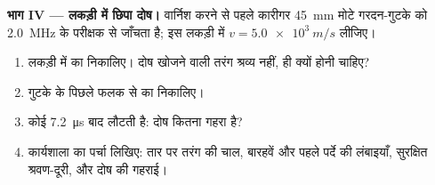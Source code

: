 \begin{problem}
\medskip
\noindent\textbf{भाग IV --- लकड़ी में छिपा दोष।}
वार्निश करने से पहले कारीगर \qty{45}{mm} मोटे गरदन-गुटके को \qty{2.0}{MHz} के परीक्षक से
जाँचता है; इस लकड़ी में $v = \qty{5.0e3}{m/s}$ लीजिए।
\begin{enumerate}[resume]
  \item लकड़ी में  का  निकालिए। दोष
        खोजने वाली तरंग श्रव्य नहीं,  ही क्यों होनी चाहिए?
  \item गुटके के पिछले फलक से  का  निकालिए।
  \item कोई  \qty{7.2}{\micro s} बाद लौटती है: दोष कितना गहरा है?
  \item कार्यशाला का पर्चा लिखिए: तार पर तरंग की चाल, बारहवें और
        पहले पर्दे की लंबाइयाँ, सुरक्षित श्रवण-दूरी, और दोष की गहराई।
\end{enumerate}
\end{problem}
